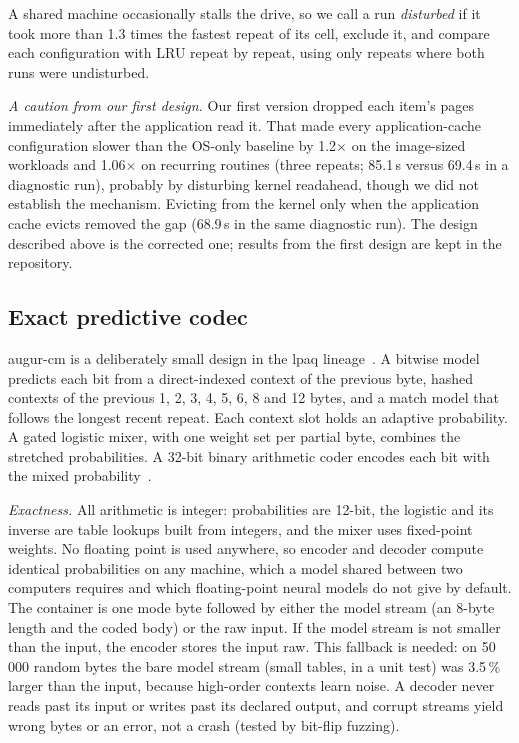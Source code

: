 \documentclass[conference]{IEEEtran}
\newcommand{\cm}{\textsf{augur-cm}}
\begin{document}
A shared machine occasionally stalls the drive, so we call a run \emph{disturbed} if it took more than 1.3 times the fastest repeat of its cell, exclude it, and compare each configuration with LRU repeat by repeat, using only repeats where both runs were undisturbed.

\emph{A caution from our first design.} Our first version dropped each item's pages immediately after the application read it. That made every application-cache configuration slower than the OS-only baseline by 1.2$\times$ on the image-sized workloads and 1.06$\times$ on recurring routines (three repeats; 85.1\,s versus 69.4\,s in a diagnostic run), probably by disturbing kernel readahead, though we did not establish the mechanism. Evicting from the kernel only when the application cache evicts removed the gap (68.9\,s in the same diagnostic run). The design described above is the corrected one; results from the first design are kept in the repository.

\subsection{Exact predictive codec}\label{sec:codec}
\cm{} is a deliberately small design in the lpaq lineage~\cite{mahoney2005}. A bitwise model predicts each bit from a direct-indexed context of the previous byte, hashed contexts of the previous 1, 2, 3, 4, 5, 6, 8 and 12 bytes, and a match model that follows the longest recent repeat. Each context slot holds an adaptive probability. A gated logistic mixer, with one weight set per partial byte, combines the stretched probabilities. A 32-bit binary arithmetic coder encodes each bit with the mixed probability~\cite{witten1987}.

\emph{Exactness.} All arithmetic is integer: probabilities are 12-bit, the logistic and its inverse are table lookups built from integers, and the mixer uses fixed-point weights. No floating point is used anywhere, so encoder and decoder compute identical probabilities on any machine, which a model shared between two computers requires and which floating-point neural models do not give by default. The container is one mode byte followed by either the model stream (an 8-byte length and the coded body) or the raw input. If the model stream is not smaller than the input, the encoder stores the input raw. This fallback is needed: on 50\,000 random bytes the bare model stream (small tables, in a unit test) was 3.5\,\% larger than the input, because high-order contexts learn noise. A decoder never reads past its input or writes past its declared output, and corrupt streams yield wrong bytes or an error, not a crash (tested by bit-flip fuzzing).
\end{document}
